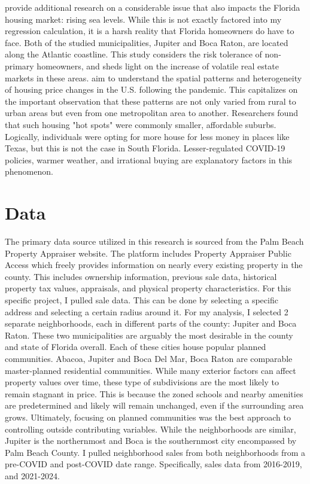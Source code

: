 \documentclass[12pt,english]{article}
\begin{document}
\cite{FuNijman2020} provide additional research on a considerable issue that also impacts the Florida housing market: rising sea levels. While this is not exactly factored into my regression calculation, it is a harsh reality that Florida homeowners do have to face. Both of the studied municipalities, Jupiter and Boca Raton, are located along the Atlantic coastline. This study considers the risk tolerance of non-primary homeowners, and sheds light on the increase of volatile real estate markets in these areas. \cite{LiChuanrong2021} aim to understand the spatial patterns and heterogeneity of housing price changes in the U.S. following the pandemic. This capitalizes on the important observation that these patterns are not only varied from rural to urban areas but even from one metropolitan area to another. Researchers found that such housing "hot spots" were commonly smaller, affordable suburbs. Logically, individuals were opting for more house for less money in places like Texas, but this is not the case in South Florida. Lesser-regulated COVID-19 policies, warmer weather, and irrational buying are explanatory factors in this phenomenon. 




\section{Data}\label{sec:data}
The primary data source utilized in this research is sourced from the Palm Beach Property Appraiser website. The platform includes Property Appraiser Public Access which freely provides information on nearly every existing property in the county. This includes ownership information, previous sale data, historical property tax values, appraisals, and physical property characteristics. For this specific project, I pulled sale data. This can be done by selecting a specific address and selecting a certain radius around it. For my analysis, I selected 2 separate neighborhoods, each in different parts of the county: Jupiter and Boca Raton. These two municipalities are arguably the most desirable in the county and state of Florida overall. Each of these cities house popular planned communities. Abacoa, Jupiter and Boca Del Mar, Boca Raton are comparable master-planned residential communities. While many exterior factors can affect property values over time, these type of subdivisions are the most likely to remain stagnant in price. This is because the zoned schools and nearby amenities are predetermined and likely will remain unchanged, even if the surrounding area grows. Ultimately, focusing on planned communities was the best approach to controlling outside contributing variables. While the neighborhoods are similar, Jupiter is the northernmost and Boca is the southernmost city encompassed by Palm Beach County. I pulled neighborhood sales from both neighborhoods from a pre-COVID and post-COVID date range. Specifically, sales data from 2016-2019, and 2021-2024. 
\end{document}
